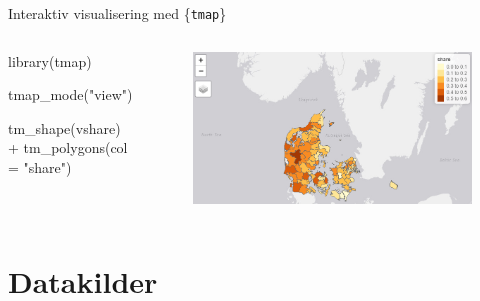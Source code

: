 \documentclass[
  8pt,
  ignorenonframetext,
  aspectratio=169]{beamer}
\newenvironment{Shaded}{}{}
\newcommand{\AttributeTok}[1]{\textcolor[rgb]{0.49,0.56,0.16}{#1}}
\newcommand{\FunctionTok}[1]{\textcolor[rgb]{0.02,0.16,0.49}{#1}}
\newcommand{\NormalTok}[1]{#1}
\newcommand{\SpecialCharTok}[1]{\textcolor[rgb]{0.25,0.44,0.63}{#1}}
\newcommand{\StringTok}[1]{\textcolor[rgb]{0.25,0.44,0.63}{#1}}
\newcommand{\columnsbegin}{\begin{columns}}
\newcommand{\columnsend}{\end{columns}}
\begin{document}
\begin{frame}[fragile]{Interaktiv visualisering med \{\texttt{tmap}\}}
\protect\hypertarget{interaktiv-visualisering-med-tmap-2}{}
\columnsbegin
{}

\tiny

\begin{Shaded}
\begin{Highlighting}[]
\FunctionTok{library}\NormalTok{(tmap)}

\FunctionTok{tmap\_mode}\NormalTok{(}\StringTok{"view"}\NormalTok{)}

\FunctionTok{tm\_shape}\NormalTok{(vshare) }\SpecialCharTok{+}
  \FunctionTok{tm\_polygons}\NormalTok{(}\AttributeTok{col =} \StringTok{"share"}\NormalTok{)}
\end{Highlighting}
\end{Shaded}

\normalsize {}

\begin{figure}[H]
    \centering
    \includegraphics[width=.90\textwidth]{pictures/tmap.png}
\end{figure}

\columnsend
\end{frame}

\hypertarget{datakilder}{%
\section{Datakilder}\label{datakilder}}
\end{document}
